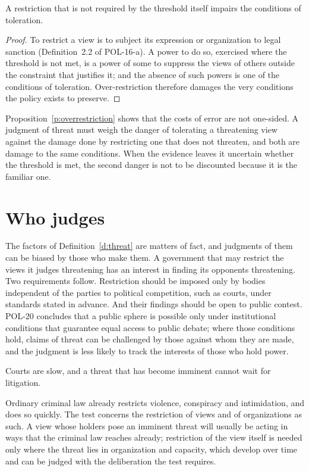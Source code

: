 \documentclass{situationist-preprint}
\begin{document}
\begin{proposition}\label{p:overrestriction}
A restriction that is not required by the threshold itself impairs the conditions of toleration.
\end{proposition}

\begin{proof}
To restrict a view is to subject its expression or organization to legal sanction (Definition~2.2 of POL-16-a). A power to do so, exercised where the threshold is not met, is a power of some to suppress the views of others outside the constraint that justifies it; and the absence of such powers is one of the conditions of toleration. Over-restriction therefore damages the very conditions the policy exists to preserve.
\end{proof}

Proposition~\ref{p:overrestriction} shows that the costs of error are not one-sided. A judgment of threat must weigh the danger of tolerating a threatening view against the damage done by restricting one that does not threaten, and both are damage to the same conditions. When the evidence leaves it uncertain whether the threshold is met, the second danger is not to be discounted because it is the familiar one.

\section{Who judges}

The factors of Definition~\ref{d:threat} are matters of fact, and judgments of them can be biased by those who make them. A government that may restrict the views it judges threatening has an interest in finding its opponents threatening. Two requirements follow. Restriction should be imposed only by bodies independent of the parties to political competition, such as courts, under standards stated in advance. And their findings should be open to public contest. POL-20 concludes that a public sphere is possible only under institutional conditions that guarantee equal access to public debate; where those conditions hold, claims of threat can be challenged by those against whom they are made, and the judgment is less likely to track the interests of those who hold power.

\begin{objection}
Courts are slow, and a threat that has become imminent cannot wait for litigation.
\end{objection}

\begin{reply}
Ordinary criminal law already restricts violence, conspiracy and intimidation, and does so quickly. The test concerns the restriction of views and of organizations as such. A view whose holders pose an imminent threat will usually be acting in ways that the criminal law reaches already; restriction of the view itself is needed only where the threat lies in organization and capacity, which develop over time and can be judged with the deliberation the test requires.
\end{reply}
\end{document}
